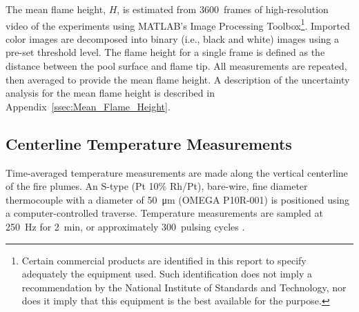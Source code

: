 \documentclass[12pt]{article}
\begin{document}
The mean flame height, $H$, is estimated from 3600~frames of high-resolution video of the experiments using MATLAB’s Image Processing Toolbox\footnote{\label{fn:product} Certain commercial products are identified in this report to specify adequately the equipment used. Such identification does not imply a recommendation by the National Institute of Standards and Technology, nor does it imply that this equipment is the best available for the purpose.}. Imported color images are decomposed into binary (i.e., black and white) images using a pre-set threshold level. The flame height for a single frame is defined as the distance between the pool surface and flame tip. All measurements are repeated, then averaged to provide the mean flame height. A description of the uncertainty analysis for the mean flame height is described in Appendix~\ref{ssec:Mean_Flame_Height}.

\subsection{Centerline Temperature Measurements}
\label{ssec:Temperature_Measurements}

Time-averaged temperature measurements are made along the vertical centerline of the fire plumes. An S-type (Pt 10\% Rh/Pt), bare-wire, fine diameter thermocouple with a diameter of \SI{50}{\micro\metre} (OMEGA P10R-001) is positioned using a computer-controlled traverse. Temperature measurements are sampled at \SI{250}{Hz} for \SI{2}{min}, or approximately 300~pulsing cycles \cite{Wang2019}.
\end{document}
